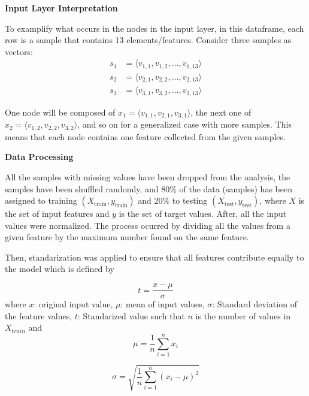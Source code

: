 \documentclass[12pt]{article}
\begin{document}
\textbf{Input Layer Interpretation}

To examplify what occurs in the nodes in the input layer, in this dataframe, each row is a sample that contains 13 elements/features. Consider three samples as vectors:
\begin{equation}
    \begin{aligned}
    s_{1} &= \langle v_{1,1}, v_{1,2}, \ldots, v_{1,13} \rangle \\
    s_{2} &= \langle v_{2,1}, v_{2,2}, \ldots, v_{2,13} \rangle \\
    s_{3} &= \langle v_{3,1}, v_{3,2}, \ldots, v_{3,13} \rangle
    \end{aligned}
\end{equation}

One node will be composed of \( x_{1} = \langle v_{1,1}, v_{2,1}, v_{3,1} \rangle \), the next one of \( x_{2} = \langle v_{1,2}, v_{2,2}, v_{3,2} \rangle \), and so on for a generalized case with more samples. This means that each node contains one feature collected from the given samples.

\textbf{Data Processing}

All the samples with missing values have been dropped from the analysis, the samples have been shuffled randomly, and 80\% of the data (samples) has been assigned to training \( (X_{\text{train}}, y_{\text{train}}) \) and 20\% to testing \( (X_{\text{test}}, y_{\text{test}}) \), where \( X \) is the set of input features and \( y \) is the set of target values.
After, all the input values were normalized. The process ocurred by dividing all the values from a given feature by the maximum number found on the same feature.

Then, standarization was applied to ensure that all features contribute equally to the model which is defined by

\begin{equation}
    t = \frac{x-\mu}{\sigma}
\end{equation}
where $x$: original input value, $\mu$: mean of input values, $\sigma$: Standard deviation of the feature values, $t$: Standarized value such that $n$ is the number of values in $X_{train}$ and
\begin{equation}
    \mu = \frac{1}{n}\sum_{i = 1}^{n}x_{i}
\end{equation}

\begin{equation}
    \sigma = \sqrt{\frac{1}{n}\sum_{i = 1}^{n}(x_{i}-\mu)^2}
\end{equation}
\end{document}
